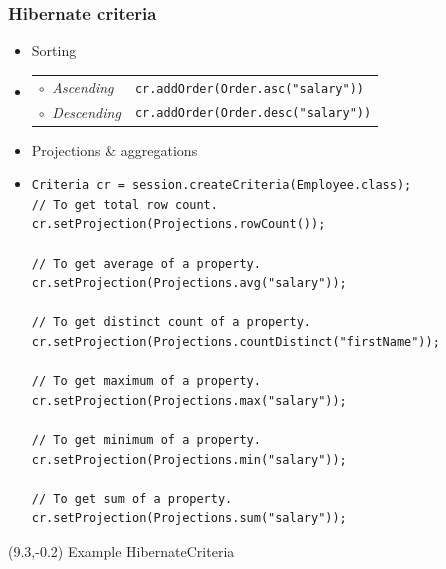 \documentclass[10pt,xcolor=pdflatex]{beamer}
\begin{document}
\begin{frame}[fragile]\frametitle{Hibernate criteria}
	\begin{itemize}
		\item Sorting
        \item[]
			\footnotesize
          	\begin{tabular}{l p{6cm}}	
				$\circ\ $ \emph{Ascending} &
                \verb'cr.addOrder(Order.asc("salary"))'\\[.1cm]
				$\circ\ $ \emph{Descending} & 				
                \verb'cr.addOrder(Order.desc("salary"))'
          	\end{tabular}
          	\normalsize
        \medskip
		\item Projections $\mathcal{\&}$ aggregations
		\item[]
        	\footnotesize
            \lstset{language=Java}
            \begin{lstlisting}    
Criteria cr = session.createCriteria(Employee.class);
// To get total row count.
cr.setProjection(Projections.rowCount());

// To get average of a property.
cr.setProjection(Projections.avg("salary"));

// To get distinct count of a property.
cr.setProjection(Projections.countDistinct("firstName"));

// To get maximum of a property.
cr.setProjection(Projections.max("salary"));

// To get minimum of a property.
cr.setProjection(Projections.min("salary"));

// To get sum of a property.
cr.setProjection(Projections.sum("salary"));
			\end{lstlisting}  
            \normalsize        
	\end{itemize}
\begin{textblock}{15}(9.3,-0.2)
    {\footnotesize Example HibernateCriteria}
\end{textblock}
\end{frame}
\end{document}

